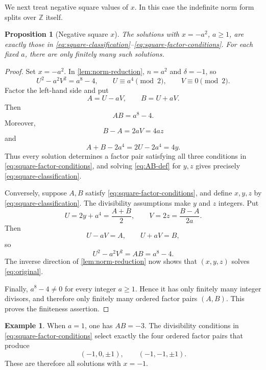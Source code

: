 \documentclass[a4paper,11pt]{amsart}
\newtheorem{proposition}[proposition]{Proposition}
\theoremstyle{definition}
\newtheorem{example}[example]{Example}
\theoremstyle{remark}
\newcommand{\Z}{\mathbb Z}
\begin{document}
We next treat negative square values of $x$.  In this case the indefinite norm form splits over $\Z$ itself.

\begin{proposition}[Negative square $x$]\label{prop:negative-square}
The solutions with $x=-a^2$, $a\ge1$, are exactly those in \eqref{eq:square-classification}--\eqref{eq:square-factor-conditions}.  For each fixed $a$, there are only finitely many such solutions.
\end{proposition}

\begin{proof}
Set $x=-a^2$.  In \cref{lem:norm-reduction}, $n=a^2$ and $\delta=-1$, so
\begin{equation}\label{eq:square-norm}
U^2-a^2V^2=a^8-4,
\qquad
U\equiv a^4\pmod2,
\qquad V\equiv0\pmod2.
\end{equation}
Factor the left-hand side and put
\begin{equation}\label{eq:AB-def}
A=U-aV,
\qquad B=U+aV.
\end{equation}
Then
\begin{equation}\label{eq:AB-product}
AB=a^8-4.
\end{equation}
Moreover,
\[
B-A=2aV=4az
\]
and
\[
A+B-2a^4=2U-2a^4=4y.
\]
Thus every solution determines a factor pair satisfying all three conditions in \eqref{eq:square-factor-conditions}, and solving \eqref{eq:AB-def} for $y,z$ gives precisely \eqref{eq:square-classification}.

Conversely, suppose $A,B$ satisfy \eqref{eq:square-factor-conditions}, and define $x,y,z$ by \eqref{eq:square-classification}.  The divisibility assumptions make $y$ and $z$ integers.  Put
\[
U=2y+a^4=\frac{A+B}{2},
\qquad
V=2z=\frac{B-A}{2a}.
\]
Then
\[
U-aV=A,
\qquad U+aV=B,
\]
so
\[
U^2-a^2V^2=AB=a^8-4.
\]
The inverse direction of \cref{lem:norm-reduction} now shows that $(x,y,z)$ solves \eqref{eq:original}.

Finally, $a^8-4\ne0$ for every integer $a\ge1$.  Hence it has only finitely many integer divisors, and therefore only finitely many ordered factor pairs $(A,B)$.  This proves the finiteness assertion.
\end{proof}

\begin{example}\label{ex:x-minus-one}
When $a=1$, one has $AB=-3$.  The divisibility conditions in \eqref{eq:square-factor-conditions} select exactly the four ordered factor pairs that produce
\[
(-1,0,\pm1),
\qquad
(-1,-1,\pm1).
\]
These are therefore all solutions with $x=-1$.
\end{example}
\end{document}
